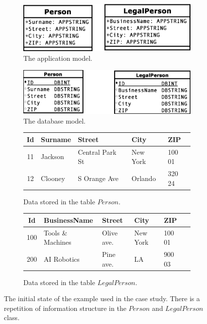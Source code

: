 \documentclass[11pt]{article}
\begin{document}
\begin{figure}
\begin{subfigure}[b]{0.5\textwidth}
	\includegraphics[width=\textwidth]{./images/case_app_1}
	\caption{The application model.}
\end{subfigure}
\begin{subfigure}[b]{0.5\textwidth}
	\includegraphics[width=\textwidth]{./images/case_db_1}
	\caption{The database model.}
\end{subfigure}
\begin{subfigure}[b]{\textwidth}
	\centering
	\begin{tabular}{| c | l | l | l | l | }
	 	\hline
		Id &  Surname & Street & City & ZIP  \\ \hline  
		11 & Jackson & Central Park St & New York & 100 01  \\ \hline
		12 & Clooney & S Orange Ave & Orlando & 320 24  \\ \hline
	\end{tabular}
	\caption{Data stored in the table $Person$.}
\end{subfigure}
\begin{subfigure}[b]{\textwidth}
	\centering
	\begin{tabular}{| c | l | l | l | l | c |}
	 	\hline
		Id &  BusinessName & Street & City & ZIP \\ \hline  
		100 & Tools \& Machines & Olive ave. & New York & 100 01 \\ \hline
		200 & AI Robotics & Pine ave. & LA & 900 03  \\ \hline
	\end{tabular}
	\caption{Data stored in the table $LegalPerson$.}
\end{subfigure}
	\caption{The initial state of the example used in the case study. There is a repetition of information structure in the $Person$ and $LegalPerson$ class.}
	\label{fig:case1}
\end{figure}
\end{document}

